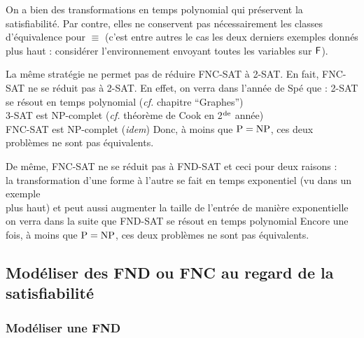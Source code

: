 		\begin{Remarque}
			On a bien des transformations en temps polynomial qui préservent la satisfiabilité. Par contre, elles ne conservent pas nécessairement les classes d'équivalence pour \(\equiv\) (c'est entre autres le cas les deux derniers exemples donnés plus haut : considérer l'environnement envoyant toutes les variables sur \(\F\)).
		\end{Remarque}
		
		\begin{Remarque}
		La même stratégie ne permet pas de réduire \textsf{FNC-SAT} à \textsf{2-SAT}. En fait, \textsf{FNC-SAT} ne se réduit pas à \textsf{2-SAT}. En effet, on verra dans l'année de Spé que : \nt
			\hspace*{5mm} \bdot \textsf{2-SAT} se résout en temps polynomial (\emph{cf.} chapitre ``Graphes'') \\
			\hspace*{5mm} \bdot \textsf{3-SAT} est NP-complet (\emph{cf.} théorème de Cook en 2$^{\rm{de}}$ année) \\
			\hspace*{5mm} \bdot \textsf{FNC-SAT} est NP-complet (\emph{idem}) \nt
		Donc, à moins que \(\rm{P} = \rm{NP}\), ces deux problèmes ne sont pas équivalents.
		\end{Remarque}
		
		\vs{2}
		\begin{Remarque}
			De même, \textsf{FNC-SAT} ne se réduit pas à \textsf{FND-SAT} et ceci pour deux raisons : \\
			\hspace*{5mm} \bdot la transformation d'une forme à l'autre se fait en temps exponentiel (vu dans un exemple \\ \listskip plus haut) et peut aussi augmenter la taille de l'entrée de manière exponentielle \\
			\hspace*{5mm} \bdot on verra dans la suite que \textsf{FND-SAT} se résout en temps polynomial \nt
		Encore une fois, à moins que \(\rm{P} = \rm{NP}\), ces deux problèmes ne sont pas équivalents.
		\end{Remarque}
	\subsection{Modéliser des FND ou FNC au regard de la satisfiabilité}
	
		\subsubsection{Modéliser une FND}
		

